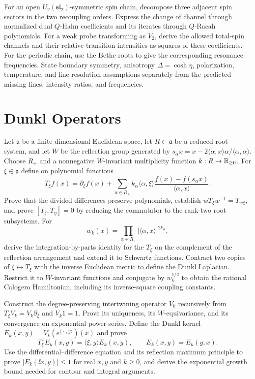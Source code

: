 \begin{exercise}
For an open $U_v(\mathfrak{sl}_2)$-symmetric spin chain, decompose three
adjacent spin sectors in the two recoupling orders.  Express the change of
channel through normalized dual $Q$-Hahn coefficients and its iterates through
$Q$-Racah polynomials.  For a weak probe transforming as $V_2$, derive the
allowed total-spin channels and their relative transition intensities as
squares of these coefficients.  For the periodic chain, use the Bethe roots
to give the corresponding resonance frequencies.  State boundary symmetry,
anisotropy $\Delta=\cosh\eta$, polarization, temperature, and line-resolution
assumptions separately from the predicted missing lines, intensity ratios,
and frequencies.
\end{exercise}

\section{Dunkl Operators}

\begin{exercise}
Let $\mathfrak a$ be a finite-dimensional Euclidean space, let
$R\subset\mathfrak a$ be a reduced root system, and let $W$ be the reflection
group generated by
$s_\alpha x=x-2\langle\alpha,x\rangle\alpha/\langle\alpha,\alpha\rangle$.
Choose $R_+$ and a nonnegative $W$-invariant multiplicity function
$k:R\to\mathbb R_{\geq0}$.  For $\xi\in\mathfrak a$ define on polynomial functions
\[
 T_\xi f(x)=\partial_\xi f(x)+
 \sum_{\alpha\in R_+}k_\alpha\langle\alpha,\xi\rangle
 \frac{f(x)-f(s_\alpha x)}{\langle\alpha,x\rangle}.
\]
Prove that the divided differences preserve polynomials, establish
$wT_\xi w^{-1}=T_{w\xi}$, and prove $[T_\xi,T_\eta]=0$ by reducing the
commutator to the rank-two root subsystems.  For
\[
 w_k(x)=\prod_{\alpha\in R_+}|\langle\alpha,x\rangle|^{2k_\alpha},
\]
derive the integration-by-parts identity for the $T_\xi$ on the complement of
the reflection arrangement and extend it to Schwartz functions.  Contract
two copies of $\xi\mapsto T_\xi$ with the inverse Euclidean metric to define
the Dunkl Laplacian.  Restrict it to $W$-invariant functions and conjugate by
$w_k^{1/2}$ to obtain the rational Calogero Hamiltonian, including its
inverse-square coupling constants.
\end{exercise}

\begin{exercise}
Construct the degree-preserving intertwining operator $V_k$ recursively from
$T_\xi V_k=V_k\partial_\xi$ and $V_k1=1$.  Prove its uniqueness, its
$W$-equivariance, and its convergence on exponential power series.  Define the Dunkl kernel
$E_k(x,y)=V_k(e^{\langle\,\cdot\,,y\rangle})(x)$ and prove
\[
 T_\xi^xE_k(x,y)=\langle\xi,y\rangle E_k(x,y),
 \qquad E_k(x,y)=E_k(y,x).
\]
Use the differential--difference equation and its reflection maximum
principle to prove $|E_k(\ii x,y)|\leq1$ for real $x,y$ and $k\geq0$, and
derive the exponential growth bound needed for contour and integral
arguments.
\end{exercise}

